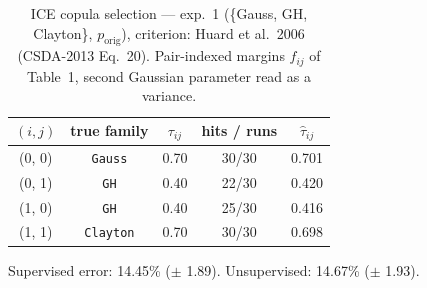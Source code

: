 \begin{table}[htbp]
  \centering
  \caption{ICE copula selection — exp.\ 1 (\{Gauss, GH, Clayton\}, $p_{\text{orig}}$), criterion: Huard et al.\ 2006 (CSDA-2013 Eq.\ 20). Pair-indexed margins $f_{ij}$ of Table~1, second Gaussian parameter read as a variance.}
  \label{tab:exp3-exp1_orig_p__huard}
  \begin{tabular}{ccccc}
    \toprule
    $(i, j)$ & true family & $\tau_{ij}$ & hits / runs & $\hat\tau_{ij}$ \\
    \midrule
    (0, 0) & \texttt{Gauss} & 0.70 & 30/30 & 0.701 \\
    (0, 1) & \texttt{GH} & 0.40 & 22/30 & 0.420 \\
    (1, 0) & \texttt{GH} & 0.40 & 25/30 & 0.416 \\
    (1, 1) & \texttt{Clayton} & 0.70 & 30/30 & 0.698 \\
    \bottomrule
  \end{tabular}
  \par\smallskip Supervised error: 14.45\% ($\pm$ 1.89). Unsupervised: 14.67\% ($\pm$ 1.93).
\end{table}

